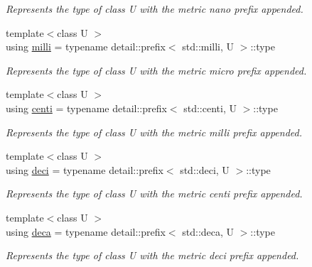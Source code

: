 \begin{DoxyCompactItemize}
\begin{DoxyCompactList}\small\item\em Represents the type of {\ttfamily class U} with the metric \textquotesingle{}nano\textquotesingle{} prefix appended. \end{DoxyCompactList}\item 
{\footnotesize template$<$class U $>$ }\\using \hyperlink{group___unit_manipulators_gaec9d1c320e180eb59f3cb3094d8079dd}{milli} = typename detail\+::prefix$<$ std\+::milli, U $>$\+::type
\begin{DoxyCompactList}\small\item\em Represents the type of {\ttfamily class U} with the metric \textquotesingle{}micro\textquotesingle{} prefix appended. \end{DoxyCompactList}\item 
{\footnotesize template$<$class U $>$ }\\using \hyperlink{group___unit_manipulators_ga33baefb1c4e794428d7ef77467a8b13e}{centi} = typename detail\+::prefix$<$ std\+::centi, U $>$\+::type
\begin{DoxyCompactList}\small\item\em Represents the type of {\ttfamily class U} with the metric \textquotesingle{}milli\textquotesingle{} prefix appended. \end{DoxyCompactList}\item 
{\footnotesize template$<$class U $>$ }\\using \hyperlink{group___unit_manipulators_ga21c21d358600828a0a49380d9df693b9}{deci} = typename detail\+::prefix$<$ std\+::deci, U $>$\+::type
\begin{DoxyCompactList}\small\item\em Represents the type of {\ttfamily class U} with the metric \textquotesingle{}centi\textquotesingle{} prefix appended. \end{DoxyCompactList}\item 
{\footnotesize template$<$class U $>$ }\\using \hyperlink{group___unit_manipulators_ga610922a1098c1f783d7c6972bbfe59f8}{deca} = typename detail\+::prefix$<$ std\+::deca, U $>$\+::type
\begin{DoxyCompactList}\small\item\em Represents the type of {\ttfamily class U} with the metric \textquotesingle{}deci\textquotesingle{} prefix appended. \end{DoxyCompactList}\item 

\end{DoxyCompactItemize}
